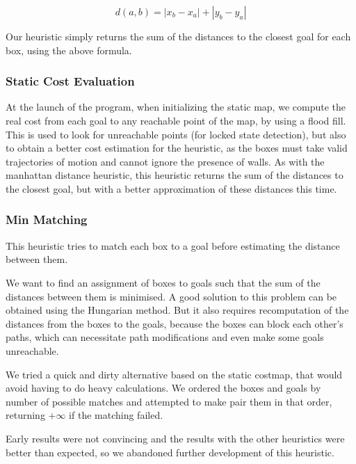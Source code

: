 \documentclass[a4paper,11pt]{article}
\begin{document}
\[ d(a,b) = |x_b - x_a | + |y_b - y_a | \]

Our heuristic simply returns the sum of the distances to the closest goal for
each box, using the above formula.

\subsubsection{Static Cost Evaluation}

At the launch of the program, when initializing the static map, we compute the
real cost from each goal to any reachable point of the map, by using a flood
fill. This is used to look for unreachable points (for locked state detection),
but also to obtain a better cost estimation for the heuristic, as the boxes must
take valid trajectories of motion and cannot ignore the presence of walls. As
with the manhattan distance heuristic, this heuristic returns the sum of the
distances to the closest goal, but with a better approximation of these
distances this time.

\subsubsection{Min Matching}

This heuristic tries to match each box to a goal before estimating the distance
between them.

We want to find an assignment of boxes to goals such that the sum of the
distances between them is minimised. A good solution to this problem can be
obtained using the Hungarian method. But it also requires recomputation of the
distances from the boxes to the goals, because the boxes can block each other's
paths, which can necessitate path modifications and even make some goals
unreachable.

We tried a quick and dirty alternative based on the static costmap, that would
avoid having to do heavy calculations. We ordered the boxes and goals by number
of possible matches and attempted to make pair them in that order, returning
$+\infty$ if the matching failed.

Early results were not convincing and the results with the other heuristics were
better than expected, so we abandoned further development of this heuristic.
\end{document}
